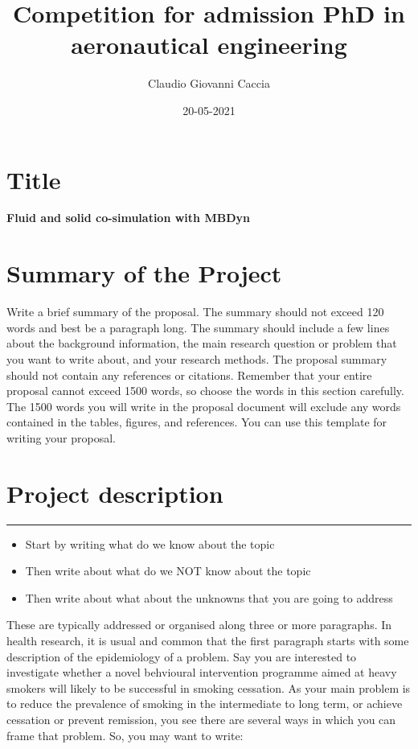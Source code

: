\documentclass[a4paper]{article}
\title{Competition for admission PhD in \\ aeronautical engineering}
\author{Claudio Giovanni Caccia}
\date{20-05-2021}
\begin{document}
\maketitle

\section*{Title}

\textbf{Fluid and solid co-simulation with MBDyn}

\section*{Summary of the Project}

Write a brief summary of the proposal. The summary should not exceed 120 words and best be a paragraph long. The summary should include a few lines about the background information, the main research question or problem that you want to write about, and your research methods. The proposal summary should not contain any references or citations. Remember that your entire proposal cannot exceed 1500 words, so choose the words in this section carefully. The 1500 words you will write in the proposal document will exclude any words contained in the tables, figures, and references. You can use this template for writing your proposal. 

\section*{Project description}




\noindent\rule{\textwidth}{1pt}



\begin{itemize}
\item Start by writing what do we know about the topic
\item Then write about what do we NOT know about the topic 
\item Then write about what about the unknowns that you are going to address
\end{itemize}

These are typically addressed or organised along three or more paragraphs. In health research, it is usual and common that the first paragraph starts with some description of the epidemiology of a problem. Say you are interested to investigate whether a novel behvioural intervention programme aimed at heavy smokers will likely to be successful in smoking cessation. As your main problem is to reduce the prevalence of smoking in the intermediate to long term, or achieve cessation or prevent remission, you see there are several ways in which you can frame that problem. So, you may want to write:
\end{document}
